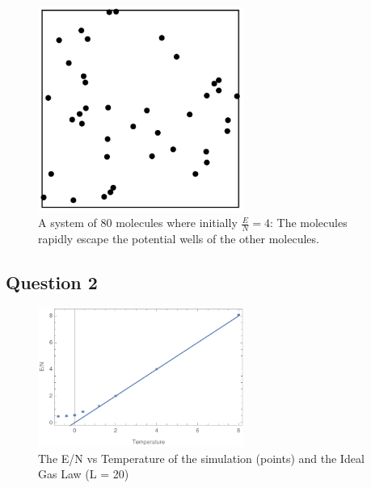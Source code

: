 \documentclass{article}
\begin{document}
\begin{figure}[!htb]
	\begin{center}
		\includegraphics[width=0.6\textwidth]{p1_hot.pdf}
	\end{center}
	\caption{A system of 80 molecules where initially $\frac{E}{N} = 4$: The molecules rapidly escape the potential wells of the other molecules.}
\label{fig:qual}
\end{figure}
\FloatBarrier

\subsection{Question 2}

\begin{figure}[!htb]
	\begin{center}
		\includegraphics[width=0.6\textwidth]{p2a.pdf}
	\end{center}
	\caption{The E/N vs Temperature of the simulation (points) and the Ideal Gas Law (L = 20)}
\label{fig:qual}
\end{figure}
\FloatBarrier
\end{document}

